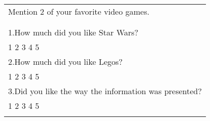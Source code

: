 \begin{table}
\begin{tabular}{p{12cm}}
\small{Mention 2 of your favorite video games.   } \\   
\small{		}\\\hline
\small{		}\\\hline
\small{1.How much did you like Star Wars? } \\ 
\small{	1			2			3			4			5	}\\\hline
\small{2.How much did you like Legos? }  \\ 
\small{	1			2			3			4			5	}\\\hline
\small{3.Did you like the way the information was presented?  } \\
\small{	1			2			3			4			5	}\\\hline 
\noalign{\smallskip}\hline
\end{tabular}
\end{table}



